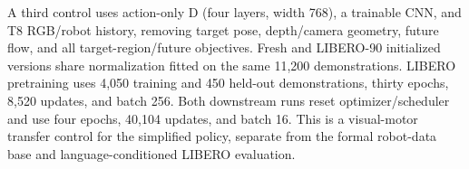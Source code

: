 A third control uses action-only D (four layers, width 768), a trainable CNN,
and T8 RGB/robot history, removing target pose, depth/camera geometry, future
flow, and all target-region/future objectives. Fresh and LIBERO-90 initialized
versions share normalization fitted on the same 11,200 demonstrations.
LIBERO pretraining uses 4,050 training and 450 held-out demonstrations,
thirty epochs, 8,520 updates, and batch 256. Both downstream runs reset
optimizer/scheduler and use four epochs, 40,104 updates, and batch 16.
This is a visual-motor transfer control for the simplified policy, separate
from the formal robot-data base and language-conditioned LIBERO evaluation.


